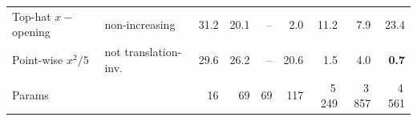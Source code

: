\begin{table}[t]
{\begin{tabular}{llrrrrrrr}
Top-hat $x-$opening & non-increasing & \textcolor{red!70!black}{31.2} & \textcolor{red!70!black}{20.1} & -- & 2.0 & \textcolor{red!70!black}{11.2} & \textcolor{red!70!black}{7.9} & \textcolor{red!70!black}{23.4}\\
Point-wise $x^2/5$ & not translation-inv. & \textcolor{red!70!black}{29.6} & \textcolor{red!70!black}{26.2} & -- & \textcolor{red!70!black}{20.6} & 1.5 & 4.0 & \textbf{0.7}\\
\midrule Params & & 16 & 69 & 69 & 117 & 5\,249 & 3\,857 & 4\,561\\
\bottomrule\end{tabular}}\end{table}